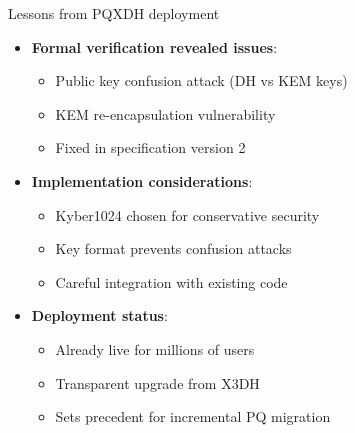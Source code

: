 \documentclass[aspectratio=169, lualatex, handout]{beamer}
\begin{document}
\begin{frame}{Lessons from PQXDH deployment}
	\begin{itemize}
		\item \textbf{Formal verification revealed issues}:
		      \begin{itemize}
			      \item Public key confusion attack (DH vs KEM keys)
			      \item KEM re-encapsulation vulnerability
			      \item Fixed in specification version 2
		      \end{itemize}
		\item \textbf{Implementation considerations}:
		      \begin{itemize}
			      \item Kyber1024 chosen for conservative security
			      \item Key format prevents confusion attacks
			      \item Careful integration with existing code
		      \end{itemize}
		\item \textbf{Deployment status}:
		      \begin{itemize}
			      \item Already live for millions of users
			      \item Transparent upgrade from X3DH
			      \item Sets precedent for incremental PQ migration
		      \end{itemize}
	\end{itemize}
\end{frame}
\end{document}
